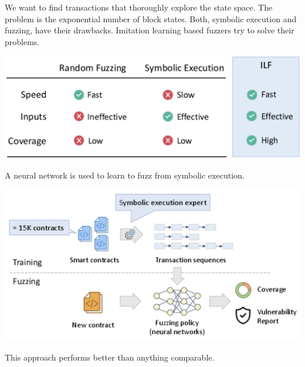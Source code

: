 We want to find transactions that thoroughly explore the state space. The problem is the exponential number of block states. Both, symbolic execution and fuzzing, have their drawbacks. Imitation learning based fuzzers try to solve their problems.
\begin{center}
	\includegraphics[width=0.9\columnwidth]{assets/fuzzing}
\end{center}

A neural network is used to learn to fuzz from symbolic execution.
\begin{center}
	\includegraphics[width=0.9\columnwidth]{assets/ilf}
\end{center}

This approach performs better than anything comparable.